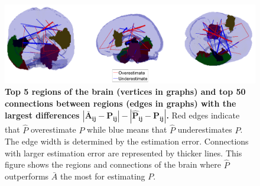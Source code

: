 \documentclass[10pt,letterpaper]{article}
\renewcommand{\hat}{\widehat}
\begin{document}
\begin{figure}[!htbp]
\centering
\includegraphics[width=1\textwidth]{Diff_between_desikan.png}
\caption{{\bf Top 5 regions of the brain (vertices in graphs) and top 50 connections between regions (edges in graphs) with the largest differences $\bm{|\bar{A}_{ij} - P_{ij}| - |\hat{P}_{ij} - P_{ij}|}$.}
Red edges indicate that $\hat{P}$ overestimate $P$ while blue means that $\hat{P}$ underestimates $P$. The edge width is determined by the estimation error. Connections with larger estimation error are represented by thicker lines. This figure shows the regions and connections of the brain where $\hat{P}$ outperforms $\bar{A}$ the most for estimating $P$.}
\label{fig:Diff_between_desikan}
\end{figure}
\end{document}
